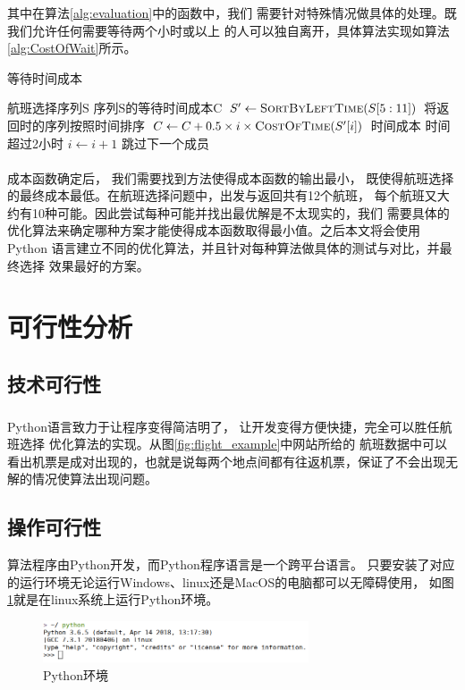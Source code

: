 \documentclass[fontset=fandol,a4paper,zihao=5]{ctexart}
\newcommand{\upcite}[1]{\textsuperscript{\textsuperscript{\cite{#1}}}}
\begin{document}
			其中在算法\ref{alg:evaluation}中的函数中，我们
            需要针对特殊情况做具体的处理。既我们允许任何需要等待两个小时或以上
            的人可以独自离开，具体算法实现如算法\ref{alg:CostOfWait}所示。
			\begin{algorithm}
				\begin{algorithmic}
					\caption{\label{alg:CostOfWait}等待时间成本}
					\Require $\text{航班选择序列S}$
					\Ensure $\text{序列S的等待时间成本C}$
					\State $S' \gets \Call {SortByLeftTime}{S[5:11]}$ \Comment 将返回时的序列按照时间排序
						\State $C \gets C + 0.5 \times i \times \Call {CostOfTime}{S'[i]}$ \Comment 时间成本
						\Comment 时间超过2小时
							\State $i \gets i + 1$ \Comment 跳过下一个成员
						\EndIf	
					\EndFor
					\State {}
					\EndFunction
				\end{algorithmic}
			\end{algorithm}
		
		成本函数确定后，
        我们需要找到方法使得成本函数的输出最小\upcite{陈冬芳2005全局最优化算法及其应用}，
        既使得航班选择的最终成本最低。在航班选择问题中，出发与返回共有12个航班，
        每个航班又大约有10种可能。因此尝试每种可能并找出最优解是不太现实的，我们
        需要具体的优化算法来确定哪种方案才能使得成本函数取得最小值。之后本文将会使用Python
        语言建立不同的优化算法，并且针对每种算法做具体的测试与对比，并最终选择 
        效果最好的方案。
	\section{可行性分析}
		\subsection{技术可行性}
			Python语言致力于让程序变得简洁明了，
            让开发变得方便快捷\upcite{Oliphant2007Python}，完全可以胜任航班选择
            优化算法的实现。从图\ref{fig:flight_example}中网站所给的
            航班数据中可以看出机票是成对出现的，也就是说每两个地点间都有往返机票，保证了不会出现无解的情况使算法出现问题。
		\subsection{操作可行性}
			算法程序由Python开发，而Python程序语言是一个跨平台语言。
            只要安装了对应的运行环境无论运行Windows、linux还是MacOS的电脑都可以无障碍使用，
            如图\ref{fig:linux_python}就是在linux系统上运行Python环境。
            \begin{figure}[!h]
                \centering
                \includegraphics[width=0.7\textwidth]{pic/linux_python.png}
                \caption{\label{fig:linux_python}Python环境}
            \end{figure}
\end{document}
